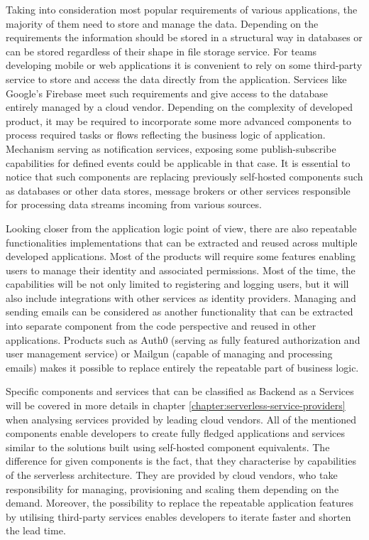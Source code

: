 Taking into consideration most popular requirements of various applications, the majority of them need to store and manage the data. Depending on the requirements the information should be stored in a structural way in databases or can be stored regardless of their shape in file storage service. For teams developing mobile or web applications it is convenient to rely on some third-party service to store and access the data directly from the application. Services like Google's Firebase meet such requirements and give access to the database entirely managed by a cloud vendor. Depending on the complexity of developed product, it may be required to incorporate some more advanced components to process required tasks or flows reflecting the business logic of application. Mechanism serving as notification services, exposing some publish-subscribe capabilities for defined events could be applicable in that case. It is essential to notice that such components are replacing previously self-hosted components such as databases or other data stores, message brokers or other services responsible for processing data streams incoming from various sources.

Looking closer from the application logic point of view, there are also repeatable functionalities implementations that can be extracted and reused across multiple developed applications. Most of the products will require some features enabling users to manage their identity and associated permissions. Most of the time, the capabilities will be not only limited to registering and logging users, but it will also include integrations with other services as identity providers. Managing and sending emails can be considered as another functionality that can be extracted into separate component from the code perspective and reused in other applications. Products such as Auth0 (serving as fully featured authorization and user management service) or Mailgun (capable of managing and processing emails) makes it possible to replace entirely the repeatable part of business logic.

Specific components and services that can be classified as Backend as a Services will be covered in more details in chapter \ref{chapter:serverless-service-providers} when analysing services provided by leading cloud vendors. All of the mentioned components enable developers to create fully fledged applications and services similar to the solutions built using self-hosted component equivalents. The difference for given components is the fact, that they characterise by capabilities of the serverless architecture. They are provided by cloud vendors, who take responsibility for managing, provisioning and scaling them depending on the demand. Moreover, the possibility to replace the repeatable application features by utilising third-party services enables developers to iterate faster and shorten the lead time.

